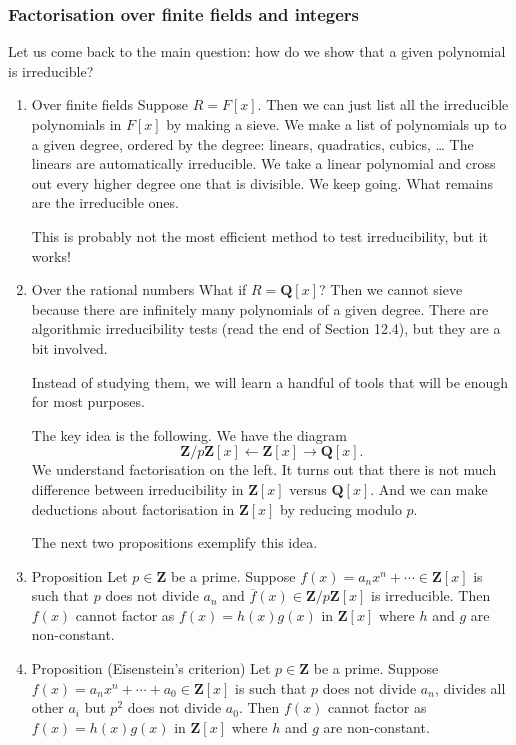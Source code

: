 \documentclass[11pt]{article}
\begin{document}
\subsubsection{Factorisation over finite fields and integers}
\label{sec:org8db8a56}
Let us come back to the main question: how do we show that a given polynomial is irreducible?  
\begin{enumerate}
\item Over finite fields
\label{sec:org331c910}
Suppose \(R = F[x]\).
Then we can just list all the irreducible polynomials in \(F[x]\) by making a sieve.
We make a list of polynomials up to a given degree, ordered by the degree: linears, quadratics, cubics, \ldots{}
The linears are automatically irreducible.
We take a linear polynomial and cross out every higher degree one that is divisible.
We keep going.
What remains are the irreducible ones.

This is probably not the most efficient method to test irreducibility, but it works!
\item Over the rational numbers
\label{sec:org126443e}
What if \(R = \mathbf{Q}[x]\)?
Then we cannot sieve because there are infinitely many polynomials of a given degree.
There are algorithmic irreducibility tests (read the end of Section 12.4), but they are a bit involved.

Instead of studying them, we will learn a handful of tools that will be enough for most purposes.

The key idea is the following.
We have the diagram
\[ \mathbf{Z}/p \mathbf{Z} [x] \leftarrow \mathbf{Z}[x] \rightarrow \mathbf{Q}[x].\]
We understand factorisation on the left.
It turns out that there is not much difference between irreducibility in \(\mathbf{Z}[x]\) versus \(\mathbf{Q}[x]\).
And we can make deductions about factorisation in \(\mathbf{Z}[x]\) by reducing modulo \(p\).

The next two propositions exemplify this idea.
\item Proposition
\label{sec:org1c52d56}
Let \(p \in \mathbf{Z}\) be a prime.
Suppose \(f(x) = a_{n} x^n + \cdots \in \mathbf{Z}[x]\) is such that \(p\) does not divide \(a_{n}\) and \(\overline f(x) \in \mathbf{Z}/p \mathbf{Z} [x]\) is irreducible.
Then \(f(x)\) cannot factor as \(f(x) = h(x) g(x)\) in \(\mathbf{Z}[x]\) where \(h\) and \(g\) are non-constant.
\item Proposition (Eisenstein's criterion)
\label{sec:org35dcbf1}
Let \(p \in \mathbf{Z}\) be a prime.
Suppose \(f(x) = a_{n} x^n + \cdots + a_{0} \in \mathbf{Z}[x]\) is such that \(p\) does not divide \(a_{n}\), divides all other \(a_i\) but \(p^2\) does not divide \(a_{0}\).
Then \(f(x)\) cannot factor as \(f(x) = h(x) g(x)\) in \(\mathbf{Z}[x]\) where \(h\) and \(g\) are non-constant.
\end{enumerate}
\end{document}
